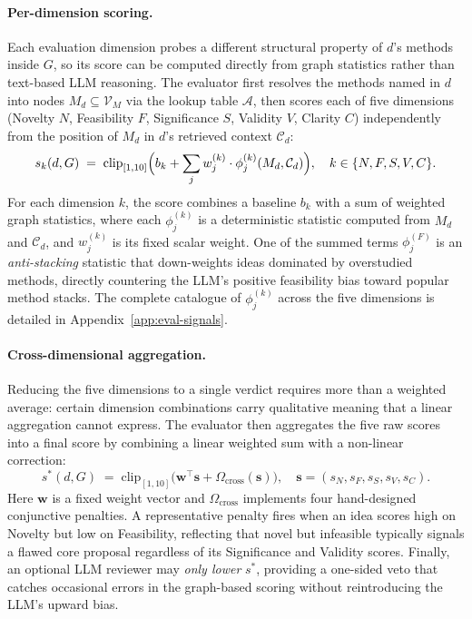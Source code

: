 \documentclass{opendatalab}
\begin{document}
\paragraph{Per-dimension scoring.}
Each evaluation dimension probes a different structural property of $d$'s methods inside $G$, so its score can be computed directly from graph statistics rather than text-based LLM reasoning. The evaluator first resolves the methods named in $d$ into nodes $M_d \subseteq \mathcal{V}_M$ via the lookup table $\mathcal{A}$, then scores each of five dimensions (Novelty $N$, Feasibility $F$, Significance $S$, Validity $V$, Clarity $C$) independently from the position of $M_d$ in $d$'s retrieved context $\mathcal{C}_d$:
\begin{equation}
s_k(d, G) \;=\; \mathrm{clip}_{[1, 10]}\Bigl(b_k + \sum_{j} w^{(k)}_j \cdot \phi^{(k)}_j(M_d, \mathcal{C}_d)\Bigr),
\quad k \in \{N, F, S, V, C\}.
\label{eq:eval-raw}
\end{equation}
For each dimension $k$, the score combines a baseline $b_k$ with a sum of weighted graph statistics, where each
$\phi^{(k)}_j$ is a deterministic statistic computed from $M_d$ and $\mathcal{C}_d$, and $w^{(k)}_j$ is its fixed scalar weight. One of the summed terms $\phi^{(F)}_j$ is an \textit{anti-stacking} statistic that down-weights ideas dominated by overstudied methods, directly countering the LLM's positive feasibility bias toward popular method stacks. The complete catalogue of $\phi^{(k)}_j$ across the five dimensions is detailed in Appendix~\ref{app:eval-signals}.

\paragraph{Cross-dimensional aggregation.}
Reducing the five dimensions to a single verdict requires more than a weighted average: certain dimension combinations carry qualitative meaning that a linear aggregation cannot express. The evaluator then aggregates the five raw scores into a final score by combining a linear weighted sum with a non-linear correction:
\begin{equation}
s^*(d, G) \;=\; \mathrm{clip}_{[1, 10]}\bigl(\mathbf{w}^{\top}\mathbf{s} + \Omega_{\text{cross}}(\mathbf{s})\bigr),
\quad \mathbf{s} = (s_N, s_F, s_S, s_V, s_C).
\label{eq:eval-agg}
\end{equation}
Here $\mathbf{w}$ is a fixed weight vector and $\Omega_{\text{cross}}$ implements four hand-designed conjunctive penalties. A representative penalty fires when an idea scores high on Novelty but low on Feasibility, reflecting that novel but infeasible typically signals a flawed core proposal regardless of its Significance and Validity scores. Finally, an optional LLM reviewer may \textit{only lower} $s^*$, providing a one-sided veto that catches occasional errors in the graph-based scoring without reintroducing the LLM's upward bias.
\end{document}
